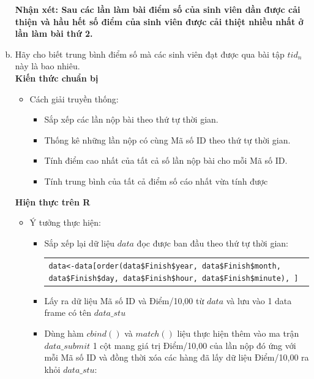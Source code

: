 \documentclass[a4paper]{article}
\theoremstyle{definition}
\begin{document}
\begin{enumerate}[a)]
\begin{itemize}
    \end{itemize}
    \bf Nhận xét: \normalfont Sau các lần làm bài điểm số của sinh viên dần được cải thiện và hầu hết số điểm của sinh viên được cải thiệt nhiều 
    nhất ở lần làm bài thứ 2.
    \bf\item Hãy cho biết trung bình điểm số mà các sinh viên đạt được qua bài tập $tid_n$ này là bao nhiêu.\\[6pt]
    \bf Kiến thức chuẩn bị\normalfont
    \begin{itemize}
        \item Cách giải truyền thống:
        \begin{itemize}
            \item Sắp xếp các lần nộp bài theo thứ tự thời gian.
            \item Thống kê những lần nộp có cùng Mã số ID theo thứ tự thời gian.
            \item Tính điểm cao nhất của tất cả số lần nộp bài cho mỗi Mã số ID.
            \item Tính trung bình của tất cả điểm số cáo nhất vừa tính được
        \end{itemize}
    \end{itemize}
    \bf Hiện thực trên R\normalfont
    \begin{itemize}
        \item Ý tưởng thực hiện:
        \begin{itemize}
            \item Sắp xếp lại dữ liệu $data$ đọc được ban đầu theo thứ tự thời gian:
            \begin{center}
                \begin{tabular}{p{13cm}}
                    \texttt{data<-data[order(data\$Finish\$year, data\$Finish\$month, data\$Finish\$day, data\$Finish\$hour, data\$Finish\$minute), ]}
                \end{tabular}
            \end{center}
            \item Lấy ra dữ liệu Mã số ID và Điểm/10,00 từ $data$ và lưu vào 1 data frame có tên $data\_stu$
            \item Dùng hàm $cbind()$ và $match()$ liệu thực hiện thêm vào ma trận $data\_submit$ 1 cột mang giá trị Điểm/10,00 của lần nộp đó ứng với mỗi Mã số ID và đồng thời xóa các hàng đã lấy dữ liệu Điểm/10,00 ra khỏi $data\_stu$:
            \begin{center}
                \begin{tabular}{p{13cm}}

\end{tabular}
\end{center}
\end{itemize}
\end{itemize}
\end{enumerate}
\end{document}
